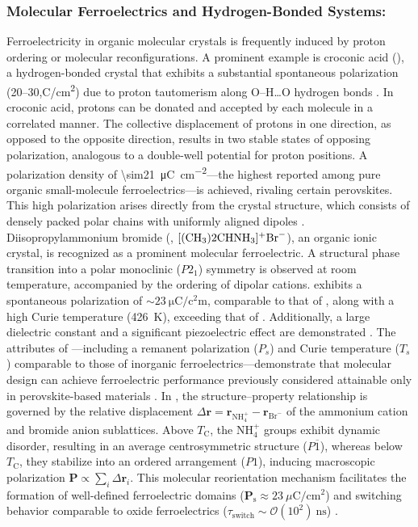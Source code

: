 \documentclass[a4paper,fleqn]{cas-sc}
\begin{document}
\subsubsection*{Molecular Ferroelectrics and Hydrogen-Bonded Systems:}
\par Ferroelectricity in organic molecular crystals is frequently induced by proton ordering or molecular reconfigurations. A prominent example is croconic acid (), a hydrogen-bonded crystal that exhibits a substantial spontaneous polarization (20--30,\textmu C/cm\textsuperscript{2}) due to proton tautomerism along O--H\ldots O hydrogen bonds \cite{Mohapatra2022}. In croconic acid, protons can be donated and accepted by each molecule in a correlated manner. The collective displacement of protons in one direction, as opposed to the opposite direction, results in two stable states of opposing polarization, analogous to a double-well potential for proton positions. A polarization density of \SI{\sim21}{\micro\coulomb\per\square\centi\meter}---the highest reported among pure organic small-molecule ferroelectrics---is achieved, rivaling certain perovskites. This high polarization arises directly from the crystal structure, which consists of densely packed polar  chains with uniformly aligned dipoles \cite{Stroppa2011}. Diisopropylammonium bromide (, $[(\ce{CH3})2\ce{CHNH3}]^+ \ce{Br}^-$), an organic ionic crystal, is recognized as a prominent molecular ferroelectric. A structural phase transition into a polar monoclinic ($P2_1$) symmetry is observed at room temperature, accompanied by the ordering of dipolar cations.  exhibits a spontaneous polarization of $\sim\SI{23}{\micro\coulomb\per\square\centi\meter}$, comparable to that of , along with a high Curie temperature (\SI{426}{\kelvin}), exceeding that of . Additionally, a large dielectric constant and a significant piezoelectric effect are demonstrated \cite{Fu2013}. The attributes of ---including a remanent polarization (\(P_s\)) and Curie temperature (\(T_s\)) comparable to those of inorganic ferroelectrics---demonstrate that molecular design can achieve ferroelectric performance previously considered attainable only in perovskite-based materials \cite{Fu2013}. In , the structure--property relationship is governed by the relative displacement $\Delta\mathbf{r} = \mathbf{r}_{\mathrm{NH}_4^+} - \mathbf{r}_{\mathrm{Br}^-}$ of the ammonium cation and bromide anion sublattices. Above $T_{\mathrm{C}}$, the $\mathrm{NH}_4^+$ groups exhibit dynamic disorder, resulting in an average centrosymmetric structure ($P\overline{1}$), whereas below $T_{\mathrm{C}}$, they stabilize into an ordered arrangement ($P1$), inducing macroscopic polarization $\mathbf{P} \propto \sum_i \Delta\mathbf{r}_i$. This molecular reorientation mechanism facilitates the formation of well-defined ferroelectric domains ($\mathbf{P}_{\mathrm{s}} \approx 23~\mu\mathrm{C}/\mathrm{cm}^2$) and switching behavior comparable to oxide ferroelectrics ($\tau_{\mathrm{switch}} \sim \mathcal{O}(10^2)~\mathrm{ns}$) \cite{Fu2013}.
\end{document}
